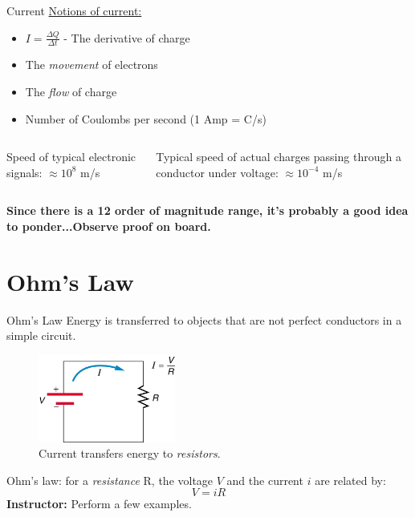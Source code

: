 \documentclass{beamer}
\begin{document}
\begin{frame}{Current}
\underline{Notions of current:}
\begin{itemize}
	\item $I = \frac{\Delta Q}{\Delta t}$ - The derivative of charge
	\item The \textit{movement} of electrons
	\item The \textit{flow} of charge
	\item Number of Coulombs per second (1 Amp = C/s)
\end{itemize}
\begin{columns}[T]
\begin{column}{0.5\textwidth}
Speed of typical electronic signals: $\approx 10^{8}$ m/s
\end{column}
\begin{column}{0.5\textwidth}
Typical speed of actual charges passing through a conductor under voltage: $\approx 10^{-4}$ m/s
\end{column}
\end{columns} \vspace{0.25cm}
\textbf{Since there is a 12 order of magnitude range, it's probably a good idea to ponder...\textbf{Observe proof on board.}}
\end{frame}

\section{Ohm's Law}

\begin{frame}{Ohm's Law}
\small
Energy is transferred to objects that are not perfect conductors in a simple circuit.
\begin{figure}
\centering
\includegraphics[width=0.4\textwidth]{figures/simple.png}
\caption{\label{fig:simple} Current transfers energy to \textit{resistors}.}
\end{figure}
Ohm's law: for a \textit{resistance} R, the voltage $V$ and the current $i$ are related by:
\begin{equation}
V = i R
\end{equation}
\textbf{Instructor:} Perform a few examples.
\end{frame}
\end{document}
